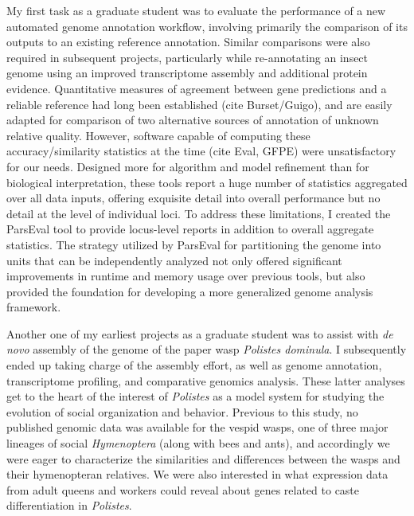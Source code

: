 My first task as a graduate student was to evaluate the performance of a new automated genome annotation workflow, involving primarily the comparison of its outputs to an existing reference annotation.
Similar comparisons were also required in subsequent projects, particularly while re-annotating an insect genome using an improved transcriptome assembly and additional protein evidence.
Quantitative measures of agreement between gene predictions and a reliable reference had long been established (cite Burset/Guigo), and are easily adapted for comparison of two alternative sources of annotation of unknown relative quality.
However, software capable of computing these accuracy/similarity statistics at the time (cite Eval, GFPE) were unsatisfactory for our needs.
Designed more for algorithm and model refinement than for biological interpretation, these tools report a huge number of statistics aggregated over all data inputs, offering exquisite detail into overall performance but no detail at the level of individual loci.
To address these limitations, I created the ParsEval tool to provide locus-level reports in addition to overall aggregate statistics.
The strategy utilized by ParsEval for partitioning the genome into units that can be independently analyzed not only offered significant improvements in runtime and memory usage over previous tools, but also provided the foundation for developing a more generalized genome analysis framework.

Another one of my earliest projects as a graduate student was to assist with \textit{de novo} assembly of the genome of the paper wasp \textit{Polistes dominula}.
I subsequently ended up taking charge of the assembly effort, as well as genome annotation, transcriptome profiling, and comparative genomics analysis.
These latter analyses get to the heart of the interest of \textit{Polistes} as a model system for studying the evolution of social organization and behavior.
Previous to this study, no published genomic data was available for the vespid wasps, one of three major lineages of social \textit{Hymenoptera} (along with bees and ants), and accordingly we were eager to characterize the similarities and differences between the wasps and their hymenopteran relatives.
We were also interested in what expression data from adult queens and workers could reveal about genes related to caste differentiation in \textit{Polistes}.


